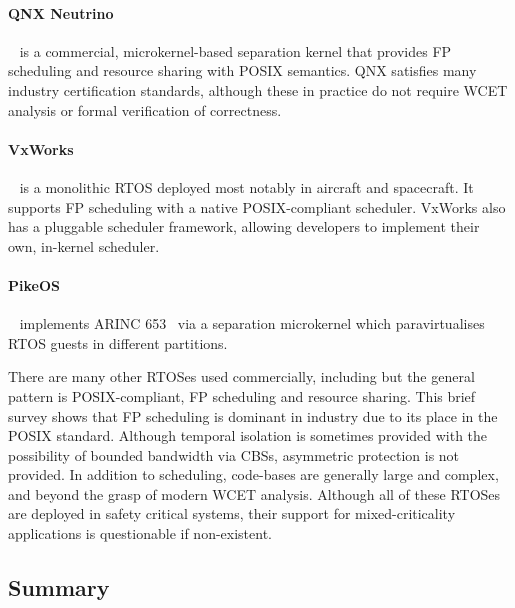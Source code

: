 \paragraph{QNX Neutrino}~\citep{QNX_10} is a commercial, microkernel-based separation kernel that provides
\gls{FP} scheduling and resource sharing with POSIX semantics.  QNX satisfies many industry
certification standards, although these in practice do not require {\gls{WCET}} analysis or formal
verification of correctness.

\paragraph{VxWorks}~\citep{VxWorks_08} is a monolithic \gls{RTOS} deployed most notably in aircraft
and spacecraft.  It supports \gls{FP} scheduling with a native POSIX-compliant scheduler.  VxWorks
also has a pluggable scheduler framework, allowing developers to implement their own, in-kernel
scheduler.

\paragraph{PikeOS}~\citep{PikeOS:URL} implements ARINC 653~\citep{ARINC653} via a separation
microkernel which paravirtualises RTOS guests in different partitions.

There are many other \gls{RTOS}es used commercially, including \citet{Deos:URL} but the general pattern is POSIX-compliant, \gls{FP} scheduling and resource sharing.
This brief survey shows that \gls{FP} scheduling is dominant in industry due to its place in the POSIX standard. 
Although temporal isolation is sometimes provided with the possibility of bounded bandwidth via
\glspl{CBS}, asymmetric protection is not provided.  In addition to scheduling, code-bases are
generally large and complex, and beyond the grasp of modern {\gls{WCET}} analysis.  Although all of
these \gls{RTOS}es are deployed in safety critical systems, their support for mixed-criticality
applications is questionable if non-existent. 



\subsection{Summary}


